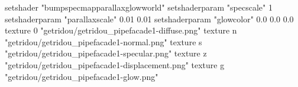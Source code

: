 setshader "bumpspecmapparallaxglowworld"
setshaderparam "specscale" 1
setshaderparam "parallaxscale" 0.01 0.01
setshaderparam "glowcolor" 0.0 0.0 0.0
texture 0 "getridou/getridou_pipefacade1-diffuse.png"
texture n "getridou/getridou_pipefacade1-normal.png"
texture s "getridou/getridou_pipefacade1-specular.png"
texture z "getridou/getridou_pipefacade1-displacement.png"
texture g "getridou/getridou_pipefacade1-glow.png"
